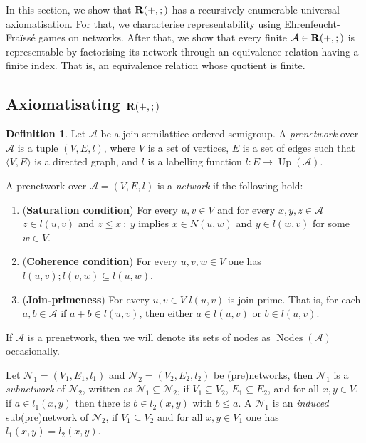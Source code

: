 \documentclass[a4paper]{article}
\theoremstyle{definition}
\newtheorem{definition}{Definition}
\theoremstyle{theorem}
\theoremstyle{proposition}
\theoremstyle{lemma}
\theoremstyle{ex}
\theoremstyle{corollary}
\theoremstyle{claim}
\begin{document}
In this section, we show that ${\bf R}(+, ;)$ has a recursively enumerable universal axiomatisation. For that, we characterise representability using Ehrenfeucht-Fra\"{i}ss\'{e} games on networks. After that, we show that every finite $\mathcal{A} \in {\bf R}(+, ;)$ is representable by factorising its network through an equivalence relation having a finite index. That is, an equivalence relation whose quotient is finite.

\subsection{Axiomatisating ${\bf R}(+, ;)$}

\begin{definition} Let $\mathcal{A}$ be a join-semilattice ordered semigroup. A \emph{prenetwork} over $\mathcal{A}$ is a tuple $(V, E, l)$, where $V$ is a set of vertices, $E$ is a set of edges such that $\langle V, E \rangle$ is a directed graph, and $l$ is a labelling function $l : E \to \operatorname{Up}(\mathcal{A})$.

  A prenetwork over $\mathcal{A} = (V, E, l)$ is a \emph{network} if the following hold:
  \begin{enumerate}
    \item ({\bf Saturation condition}) For every $u, v \in V$ and for every $x,y,z \in \mathcal{A}$ $z \in l(u, v)$ and $z \leq x \: ; \: y$ implies $x \in N(u, w)$ and $y \in l(w, v)$ for some $w \in V$.
    \item ({\bf Coherence condition}) For every $u, v, w \in V$ one has $l(u, v) ; l(v, w) \subseteq l(u, w)$.
    \item ({\bf Join-primeness}) For every $u, v \in V$ $l(u,v)$ is join-prime. That is, for each $a, b \in \mathcal{A}$ if $a + b \in l(u,v)$, then either $a \in l(u,v)$ or $b \in l(u,v)$.
  \end{enumerate}
\end{definition}

If $\mathcal{A}$ is a prenetwork, then we will denote its sets of nodes as $\operatorname{Nodes}(\mathcal{A})$ occasionally.

Let $\mathcal{N}_1 = (V_1, E_1, l_1)$ and $\mathcal{N}_2 = (V_2, E_2, l_2)$ be (pre)networks, then $\mathcal{N}_1$ is a \emph{subnetwork} of $\mathcal{N}_2$, written as $\mathcal{N}_1 \subseteq \mathcal{N}_2$,
if $V_1 \subseteq V_2$, $E_1 \subseteq E_2$, and for all $x, y \in V_1$ if $a \in l_1(x, y)$ then there is $b \in l_2(x, y)$ with $b \leq a$. A $\mathcal{N}_1$ is an \emph{induced} sub(pre)network of $\mathcal{N}_2$, if $V_1 \subseteq V_2$ and for all $x, y \in V_1$ one has $l_1(x,y) = l_2(x,y)$.
\end{document}
